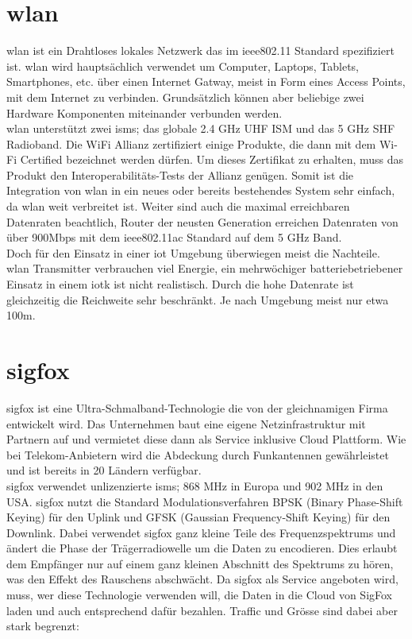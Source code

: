 \section{\gls{wlan}}

\gls{wlan} ist ein Drahtloses lokales Netzwerk das im \gls{ieee802.11} Standard spezifiziert ist. \gls{wlan} wird hauptsächlich verwendet um Computer, Laptops, Tablets, Smartphones, etc. über einen Internet Gatway, meist in Form eines Access Points, mit dem Internet zu verbinden. Grundsätzlich können aber beliebige zwei Hardware Komponenten miteinander verbunden werden.\\
\gls{wlan} unterstützt zwei \glspl{ism}; das globale 2.4 GHz UHF ISM und das 5 GHz SHF Radioband. Die WiFi Allianz zertifiziert einige Produkte, die dann mit dem \glqq{}Wi-Fi Certified\grqq{} bezeichnet werden dürfen. Um dieses Zertifikat zu erhalten, muss das Produkt den Interoperabilitäts-Tests der Allianz genügen. Somit ist die Integration von \gls{wlan} in ein neues oder bereits bestehendes System sehr einfach, da \gls{wlan} weit verbreitet ist. Weiter sind auch die maximal erreichbaren Datenraten beachtlich, Router der neusten Generation erreichen Datenraten von über 900Mbps mit dem \gls{ieee802.11}ac Standard auf dem 5 GHz Band.\\
Doch für den Einsatz in einer \gls{iot} Umgebung überwiegen meist die Nachteile. \gls{wlan} Transmitter verbrauchen viel Energie, ein mehrwöchiger batteriebetriebener Einsatz in einem \gls{iotk} ist nicht realistisch. Durch die hohe Datenrate ist gleichzeitig die Reichweite sehr beschränkt. Je nach Umgebung meist nur etwa 100m.

\section{\gls{sigfox}}

\gls{sigfox} ist eine Ultra-Schmalband-Technologie die von der gleichnamigen Firma entwickelt wird. Das Unternehmen baut eine eigene Netzinfrastruktur mit Partnern auf und vermietet diese dann als Service inklusive Cloud Plattform. Wie bei Telekom-Anbietern wird die Abdeckung durch Funkantennen gewährleistet und ist bereits in 20 Ländern verfügbar.\\
\gls{sigfox} verwendet unlizenzierte \glspl{ism}; 868 MHz in Europa und 902 MHz in den USA. 
\gls{sigfox} nutzt die Standard Modulationsverfahren BPSK (Binary Phase-Shift Keying) für den Uplink und GFSK (Gaussian Frequency-Shift Keying) für den Downlink. Dabei verwendet \gls{sigfox} ganz kleine Teile des Frequenzspektrums und ändert die Phase der Trägerradiowelle um die Daten zu encodieren. Dies erlaubt dem Empfänger nur auf einem ganz kleinen Abschnitt des Spektrums zu hören, was den Effekt des Rauschens abschwächt.
Da \gls{sigfox} als Service angeboten wird, muss, wer diese Technologie verwenden will, die Daten in die Cloud von SigFox laden und auch entsprechend dafür bezahlen. Traffic und Grösse sind dabei aber stark begrenzt:

